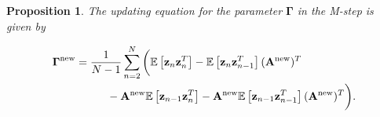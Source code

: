 \documentclass[11pt]{article}
\numberwithin{equation}{section}
\newcommand{\expectation}[1]{\mathbb{E}\left[#1\right]}
\newcommand{\z}{{\bf z}}
\newtheorem{proposition}{Proposition}[section]
\begin{document}
\begin{proposition}
	The updating equation for the parameter $\boldsymbol{\Gamma}$ in the M-step is given by
	
	\begin{align}
		\boldsymbol{\Gamma}^{\text{\normalfont new}} &= \frac{1}{N-1}\sum_{n=2}^N\bigg( \expectation{\z_n \z_n^T} - \expectation{\z_n \z_{n-1}^T}({\bf A}^{\text{\normalfont new}})^T \nonumber\\
		&\hspace{1cm} - {\bf A}^{\text{\normalfont new}}\expectation{\z_{n-1}\z_n^T} - {\bf A}^{\text{\normalfont new}}\expectation{\z_{n-1} \z_{n-1}^T}({\bf A}^{\text{\normalfont new}})^T \bigg). \label{eq:mstep-Gamma}\\
	\end{align}
\end{proposition}
\end{document}

